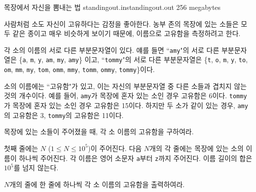 \begin{problem}{목장에서 자신을 뽐내는 법}
	{standingout.in}{standingout.out}
	{}{256 megabytes}{}
	
	사람처럼 소도 자신이 고유하다는 감정을 좋아한다. 농부 존의 목장에 있는 소들은 모두 같은 종이고 매우 비슷하게 보이기 때문에, 이름으로 고유함을 측정하려고 한다.
	
	각 소의 이름의 서로 다른 부분문자열이 있다. 얘를 들면 ``\texttt{amy}"의 서로 다른 부분문자열은 \{\texttt{a}, \texttt{m}, \texttt{y}, \texttt{am}, \texttt{my}, \texttt{amy}\} 이고, ``\texttt{tommy}"의 서로 다른 부분문자열은 \{\texttt{t}, \texttt{o}, \texttt{m}, \texttt{y}, \texttt{to}, \texttt{om}, \texttt{mm}, \texttt{my}, \texttt{tom}, \texttt{omm}, \texttt{mmy}, \texttt{tomm}, \texttt{ommy}, \texttt{tommy}\}이다.
	
	소의 이름에는 ``고유함"가 있고, 이는 자신의 부분문자열 중 다른 소들과 겹치지 않는 것의 개수이다. 예를 들어, \texttt{amy}가 목장에 혼자 있는 소인 경우 고유함은 6이다. \texttt{tommy}가 목장에 혼자 있는 소인 경우 고유함은 15이다. 하지만 두 소가 같이 있는 경우, \texttt{amy}의 고유함은 3, \texttt{tommy}의 고유함은 11이다.
	
	목장에 있는 소들이 주어졌을 때, 각 소 이름의 고유함을 구하여라.
	
	\InputFile
	
	첫째 줄에는 $N$ ($1 \le N \le 10^5$)이 주어진다. 다음 $N$개의 각 줄에는 목장에 있는 소의 이름이 하나씩 주어진다. 각 이름은 영어 소문자 \texttt{a}부터 \texttt{z}까지 주어진다. 이름 길이의 합은 $10^5$를 넘지 않는다. 

	\OutputFile
	
	$N$개의 줄에 한 줄에 하나씩 각 소 이름의 고유함을 출력하여라.
	
	\Examples
		
	\begin{example}
	\end{example}

	
	
	
\end{problem}

